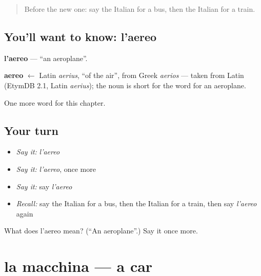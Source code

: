 \label{lesson:IT-C82-aereo}



\begin{quote}
Before the new one: say the Italian for a bus, then the Italian for a train.
\end{quote}

\subsection*{You'll want to know: l'aereo}
\textbf{l'aereo} — \textquotedblleft{}an aeroplane\textquotedblright{}.

\begin{cousinweb}
\textbf{aereo} $\leftarrow$ Latin \emph{aerius}, \textquotedblleft{}of the air\textquotedblright{}, from Greek \emph{aerios} — taken from Latin (EtymDB 2.1, Latin \emph{aerius}); the noun is short for the word for an aeroplane.
\end{cousinweb}

\begin{grammarlens}[title={What you've built}]
One more word for this chapter.
\end{grammarlens}

\subsection*{Your turn}
\begin{itemize}
\raggedright
  \item \emph{Say it:} \emph{l'aereo}
  \item \emph{Say it:} \emph{l'aereo}, once more
  \item \emph{Say it:} say \emph{l'aereo}
  \item \emph{Recall:} say the Italian for a bus, then the Italian for a train, then say \emph{l'aereo} again
\end{itemize}

\begin{tcolorbox}[breakable,colback=teal!4,colframe=teal!35!black,title={Before you move on}]
What does l'aereo mean? (\textquotedblleft{}An aeroplane\textquotedblright{}.) Say it once more.
\end{tcolorbox}
\section[la macchina]{la macchina — a car}

\label{lesson:IT-C82-macchina}



